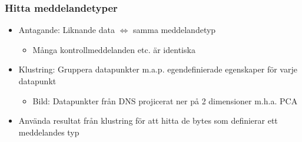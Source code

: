\documentclass[xetex, 8pt]{beamer}
\begin{document}
    \begin{frame}
        \frametitle{Hitta meddelandetyper}
        \begin{itemize}
            \item Antagande: Liknande data $\Leftrightarrow$ samma meddelandetyp
                \begin{itemize}
                    \item Många kontrollmeddelanden etc. är identiska
                \end{itemize}
            \item Klustring: Gruppera datapunkter m.a.p. egendefinierade egenskaper
                för varje datapunkt
                \begin{itemize}
                    \item Bild: Datapunkter från DNS projicerat ner på 2 dimensioner m.h.a. PCA
                \end{itemize}
            \item Använda resultat från klustring för att hitta de bytes som
                definierar ett meddelandes typ
        \end{itemize}
    \end{frame}
\end{document}
